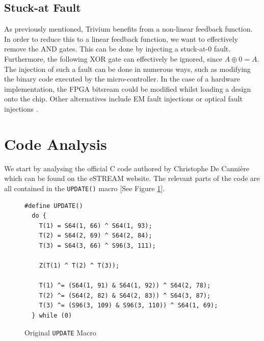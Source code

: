 \documentclass[conference]{IEEEtran}
\newcommand{\code}[1]{\texttt{#1}}
\begin{document}
\subsection{Stuck-at Fault}

As previously mentioned, Trivium benefits from a non-linear feedback function. In order to reduce this to a linear feedback function, we want to effectively remove the AND gates. This can be done by injecting a stuck-at-0 fault. Furthermore, the following XOR gate can effectively be ignored, since $A\oplus0=A$. The injection of such a fault can be done in numerous ways, such as modifying the binary code executed by the micro-controller. In the case of a hardware implementation, the FPGA bitsream could be modified whilst loading a design onto the chip. Other alternatives include EM fault injections or optical fault injections \cite{optical}.

\section{Code Analysis}\label{sec:code}

We start by analysing the official C code authored by Christophe De Canni\`ere which can be found on the eSTREAM website. The relevant parts of the code are all contained in the \code{UPDATE()} macro [See Figure \ref{orig:macro}].

\begin{figure}[H]
\begin{lstlisting}[style=snippet, frame=tlrb]
#define UPDATE()
  do { 
    T(1) = S64(1, 66) ^ S64(1, 93);
    T(2) = S64(2, 69) ^ S64(2, 84);
    T(3) = S64(3, 66) ^ S96(3, 111);

    Z(T(1) ^ T(2) ^ T(3));

    T(1) ^= (S64(1, 91) & S64(1, 92)) ^ S64(2, 78);
    T(2) ^= (S64(2, 82) & S64(2, 83)) ^ S64(3, 87);
    T(3) ^= (S96(3, 109) & S96(3, 110)) ^ S64(1, 69);
  } while (0)
\end{lstlisting}
\caption{Original \code{UPDATE} Macro}\label{orig:macro}
\end{figure}
\end{document}
